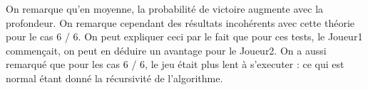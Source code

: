 \documentclass[a4paper, 10pt, french]{article}
\begin{document}
{{        On remarque qu'en moyenne, la probabilité de victoire augmente avec la profondeur. On remarque cependant des résultats
        incohérents avec cette théorie pour le cas 6 / 6. On peut expliquer ceci par le fait que pour ces tests, le Joueur1
        commençait, on peut en déduire un avantage pour le Joueur2.
        On a aussi remarqué que pour les cas 6 / 6, le jeu était plus lent à s'executer : ce qui est normal étant donné la
        récursivité de l'algorithme.
    }
}
\end{document}
